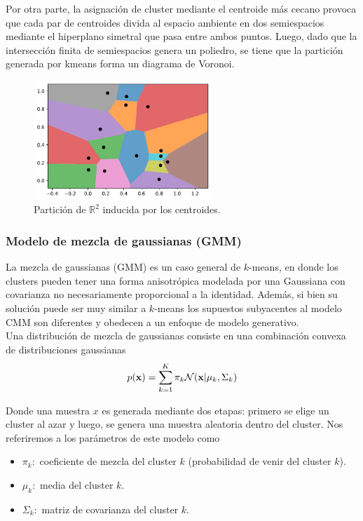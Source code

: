 Por otra parte, la asignación de cluster mediante el centroide más cecano provoca que cada par de centroides divida al espacio ambiente en dos semiespacios mediante el hiperplano simetral que pasa entre ambos puntos. Luego, dado que la intersección finita de semiespacios genera un poliedro, se tiene que la partición generada por kmeans forma un diagrama de Voronoi.

\begin{figure}[h]
  \centering
  \includegraphics[width=0.6\textwidth]{img/cap6_voronoi}
  \caption{Partición de $\mathbb{R}^2$ inducida por los centroides.}
  \label{fig:kmeans_2}
\end{figure}


\subsubsection{Modelo de mezcla de gaussianas (GMM)}

La mezcla de gaussianas (GMM) es un caso general de $k$-means, en donde los clusters pueden tener una forma anisotrópica modelada por una Gaussiana con covarianza no necesariamente proporcional a la identidad. Además, si bien su solución puede ser muy similar a $k$-means los supuestos subyacentes al modelo CMM son diferentes y obedecen a un enfoque de modelo generativo. \\


Una distribución de mezcla de gaussianas consiste en una combinación convexa de distribuciones gaussianas
\begin{equation}
	p(\mathbf{x}) = \sum_{k=1}^K \pi_k \mathcal{N}(\mathbf{x}| \mu_k,\Sigma_k)
\end{equation}

Donde una muestra $x$ es generada mediante dos etapas: primero se elige un cluster al azar y luego, se genera una muestra aleatoria dentro del cluster. Nos referiremos a los parámetros de este modelo como 

\begin{itemize}
	\item $\pi_k:$ coeficiente de mezcla del cluster  $k$ (probabilidad de venir del cluster $k$).
	\item $\mu_k:$ media del cluster  $k$.
	\item $\Sigma_k:$ matriz de covarianza del cluster  $k$.
\end{itemize}

